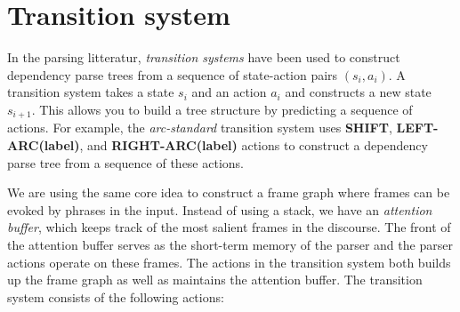 \documentclass[11pt,a4paper]{article}
\begin{document}
\section{Transition system}
\label{sec:ts}

In the parsing litteratur, \emph{transition systems} have been
used to construct dependency parse trees from a sequence of state-action pairs
$(s_i,a_i)$. A transition system takes a state $s_i$ and an action $a_i$ and
constructs a new state $s_{i+1}$. This allows you to build a tree structure by
predicting a sequence of actions. For example, the \emph{arc-standard}
transition system \cite{nivre2006} uses {\bf SHIFT}, {\bf LEFT-ARC(label)}, and
{\bf RIGHT-ARC(label)} actions to construct a dependency parse tree from a
sequence of these actions.

We are using the same core idea to construct a frame graph where frames can be
evoked by phrases in the input. Instead of using a stack, we have an
\emph{attention buffer}, which keeps track of the most salient frames in the
discourse. The front of the attention buffer serves as the short-term memory of
the parser and the parser actions operate on these frames. The actions in the
transition system both builds up the frame graph as well as maintains the
attention buffer. The transition system consists of the following actions:
\end{document}
